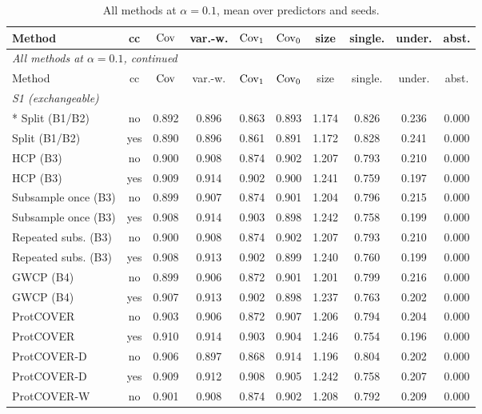 \begin{longtable}{lccccccccc}
\caption{All methods at $\alpha=0.1$, mean over predictors and seeds.}\label{tab:full10}\\
\toprule
Method & cc & $\mathrm{Cov}$ & var.-w. & $\mathrm{Cov}_1$ & $\mathrm{Cov}_0$ & size & single. & under. & abst. \\
\midrule
\endfirsthead
\multicolumn{10}{l}{\emph{All methods at $\alpha=0.1$, continued}}\\
\toprule
Method & cc & $\mathrm{Cov}$ & var.-w. & $\mathrm{Cov}_1$ & $\mathrm{Cov}_0$ & size & single. & under. & abst. \\
\midrule
\endhead
\multicolumn{10}{l}{\emph{S1 (exchangeable)}}\\*
Split (B1/B2) & no & 0.892 & 0.896 & 0.863 & 0.893 & 1.174 & 0.826 & 0.236 & 0.000 \\
Split (B1/B2) & yes & 0.890 & 0.896 & 0.861 & 0.891 & 1.172 & 0.828 & 0.241 & 0.000 \\
HCP (B3) & no & 0.900 & 0.908 & 0.874 & 0.902 & 1.207 & 0.793 & 0.210 & 0.000 \\
HCP (B3) & yes & 0.909 & 0.914 & 0.902 & 0.900 & 1.241 & 0.759 & 0.197 & 0.000 \\
Subsample once (B3) & no & 0.899 & 0.907 & 0.874 & 0.901 & 1.204 & 0.796 & 0.215 & 0.000 \\
Subsample once (B3) & yes & 0.908 & 0.914 & 0.903 & 0.898 & 1.242 & 0.758 & 0.199 & 0.000 \\
Repeated subs. (B3) & no & 0.900 & 0.908 & 0.874 & 0.902 & 1.207 & 0.793 & 0.210 & 0.000 \\
Repeated subs. (B3) & yes & 0.908 & 0.913 & 0.902 & 0.899 & 1.240 & 0.760 & 0.199 & 0.000 \\
GWCP (B4) & no & 0.899 & 0.906 & 0.872 & 0.901 & 1.201 & 0.799 & 0.216 & 0.000 \\
GWCP (B4) & yes & 0.907 & 0.913 & 0.902 & 0.898 & 1.237 & 0.763 & 0.202 & 0.000 \\
ProtCOVER & no & 0.903 & 0.906 & 0.872 & 0.907 & 1.206 & 0.794 & 0.204 & 0.000 \\
ProtCOVER & yes & 0.910 & 0.914 & 0.903 & 0.904 & 1.246 & 0.754 & 0.196 & 0.000 \\
ProtCOVER-D & no & 0.906 & 0.897 & 0.868 & 0.914 & 1.196 & 0.804 & 0.202 & 0.000 \\
ProtCOVER-D & yes & 0.909 & 0.912 & 0.908 & 0.905 & 1.242 & 0.758 & 0.207 & 0.000 \\
ProtCOVER-W & no & 0.901 & 0.908 & 0.874 & 0.902 & 1.208 & 0.792 & 0.209 & 0.000 \\

\end{longtable}

